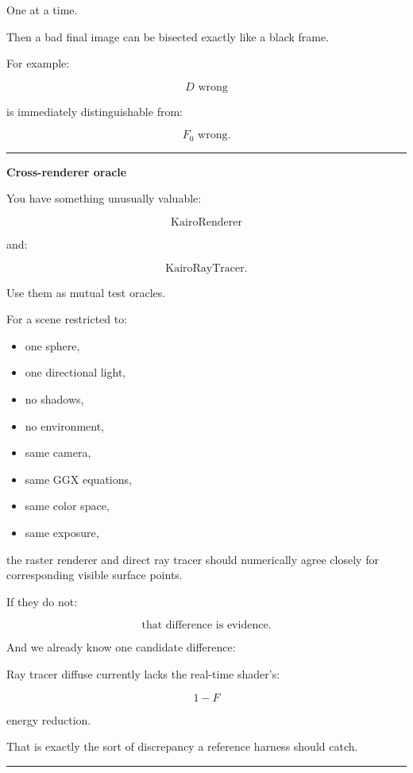 One at a time.

Then a bad final image can be bisected exactly like a black frame.

For example:

\[
D\text{ wrong}
\]

is immediately distinguishable from:

\[
F_0\text{ wrong}.
\]

\begin{center}\rule{0.5\linewidth}{0.5pt}\end{center}

\textbf{Cross-renderer oracle}

You have something unusually valuable:

\[
\text{KairoRenderer}
\]

and:

\[
\text{KairoRayTracer}.
\]

Use them as mutual test oracles.

For a scene restricted to:

\begin{itemize}
\tightlist
\item
  one sphere,
\item
  one directional light,
\item
  no shadows,
\item
  no environment,
\item
  same camera,
\item
  same GGX equations,
\item
  same color space,
\item
  same exposure,
\end{itemize}

the raster renderer and direct ray tracer should numerically agree closely for corresponding visible surface points.

If they do not:

\[
\boxed{
\text{that difference is evidence}.
}
\]

And we already know one candidate difference:

Ray tracer diffuse currently lacks the real-time shader's:

\[
1-F
\]

energy reduction.

That is exactly the sort of discrepancy a reference harness should catch.

\begin{center}\rule{0.5\linewidth}{0.5pt}\end{center}

